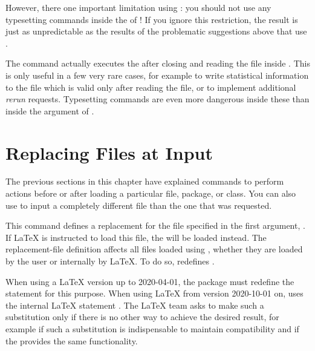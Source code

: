 However, there one important limitation using :
you should not use any typesetting commands inside the  of
! If you ignore this restriction, the result is
just as unpredictable as the results of the problematic suggestions above that
use .

The  command
actually executes the  after closing and reading the
 file inside . This is only useful
in a few very rare cases, for example to write statistical information to the
 file which is valid only after reading the  file, or to
implement additional \emph{rerun} requests. Typesetting commands are even more
dangerous inside these  than inside the argument of
.%
%
\EndIndexGroup


\section{Replacing Files at Input}

The previous sections in this chapter have explained commands to perform
actions before or after loading a particular file, package, or class. You can
also use  to input a completely different file than the one
that was requested.

\begin{Declaration}
\end{Declaration}%
This command defines a replacement
for the file specified in the first argument, . If
\LaTeX{} is instructed to load this file, the  will be
loaded instead. The replacement-file definition affects all files loaded using
, whether they are loaded by the user or internally
by \LaTeX{}. To do so,  redefines .

When using a \LaTeX{} version up to
2020-04-01, the package  must redefine the
 statement for this purpose. When using \LaTeX{} from
version 2020-10-01 on,  uses the internal \LaTeX{}
statement . The \LaTeX{} team asks to make
such a substitution only if there is no other way to achieve the desired
result, for example if such a substitution is indispensable to maintain
compatibility and if the  provides the same
functionality.

